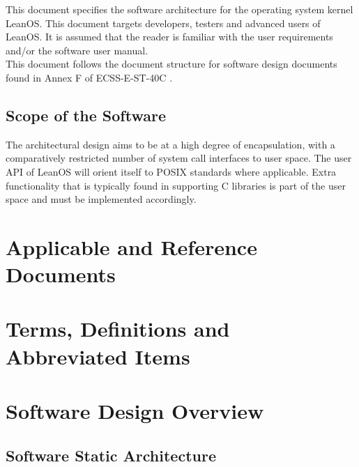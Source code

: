 This document specifies the software architecture for the operating system
kernel LeanOS. This document targets developers, testers and advanced users of
LeanOS. It is assumed that the reader is familiar with the user requirements
and/or the software user manual. \\


\noindent
This document follows the document structure for software design documents 
found in Annex F of ECSS-E-ST-40C \cite{ECSS40C}.


\section{Scope of the Software}

The architectural design aims to be at a high degree of encapsulation, with a
comparatively restricted number of system call interfaces to user space.
The user \gls{API} of LeanOS will orient itself to \gls{POSIX} standards where
applicable. Extra functionality that is typically found in supporting
C libraries is part of the user space and must be implemented accordingly.



\chapter{Applicable and Reference Documents} %

\printbibliography[heading=none]


\chapter{Terms, Definitions and Abbreviated Items}

\printglossary[type=acronym]
\printglossary[type=main, style=altlist]


\chapter{Software Design Overview}



\section{Software Static Architecture}

